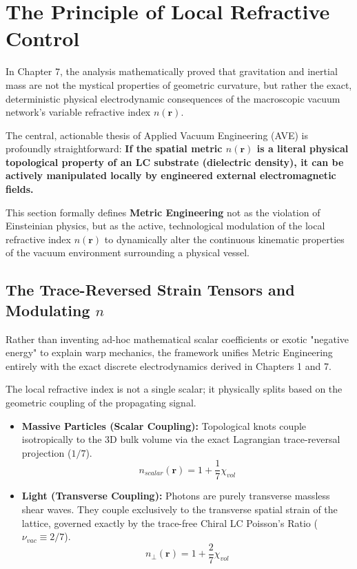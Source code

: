 \section{The Principle of Local Refractive Control}

In Chapter 7, the analysis mathematically proved that gravitation and inertial mass are not the mystical properties of geometric curvature, but rather the exact, deterministic physical electrodynamic consequences of the macroscopic vacuum network's variable refractive index $n(\mathbf{r})$. 

The central, actionable thesis of Applied Vacuum Engineering (AVE) is profoundly straightforward: \textbf{If the spatial metric $n(\mathbf{r})$ is a literal physical topological property of an LC substrate (dielectric density), it can be actively manipulated locally by engineered external electromagnetic fields.}

This section formally defines \textbf{Metric Engineering} not as the violation of Einsteinian physics, but as the active, technological modulation of the local refractive index $n(\mathbf{r})$ to dynamically alter the continuous kinematic properties of the vacuum environment surrounding a physical vessel.

\subsection{The Trace-Reversed Strain Tensors and Modulating $n$}
Rather than inventing ad-hoc mathematical scalar coefficients or exotic "negative energy" to explain warp mechanics, the framework unifies Metric Engineering entirely with the exact discrete electrodynamics derived in Chapters 1 and 7. 

The local refractive index is not a single scalar; it physically splits based on the geometric coupling of the propagating signal.
\begin{itemize}
    \item \textbf{Massive Particles (Scalar Coupling):} Topological knots couple isotropically to the 3D bulk volume via the exact Lagrangian trace-reversal projection ($1/7$).
    \begin{equation}
        n_{scalar}(\mathbf{r}) = 1 + \frac{1}{7}\chi_{vol}
    \end{equation}
    \item \textbf{Light (Transverse Coupling):} Photons are purely transverse massless shear waves. They couple exclusively to the transverse spatial strain of the lattice, governed exactly by the trace-free Chiral LC Poisson's Ratio ($\nu_{vac} \equiv 2/7$).
    \begin{equation}
        n_\perp(\mathbf{r}) = 1 + \frac{2}{7}\chi_{vol}
    \end{equation}
\end{itemize}

